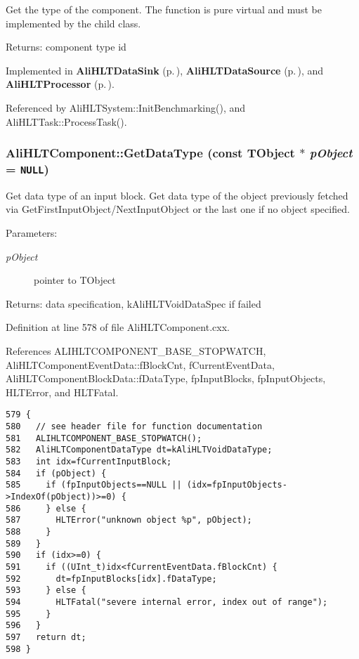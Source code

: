 Get the type of the component. The function is pure virtual and must be implemented by the child class. \begin{Desc}
\item[Returns:]component type id \end{Desc}


Implemented in {\bf Ali\-HLTData\-Sink} {\rm (p.\,\pageref{classAliHLTDataSink_a3})}, {\bf Ali\-HLTData\-Source} {\rm (p.\,\pageref{classAliHLTDataSource_a3})}, and {\bf Ali\-HLTProcessor} {\rm (p.\,\pageref{classAliHLTProcessor_a5})}.

Referenced by Ali\-HLTSystem::Init\-Benchmarking(), and Ali\-HLTTask::Process\-Task().
\subsubsection{ Ali\-HLTComponent::Get\-Data\-Type (const TObject $\ast$ {\em p\-Object} = {\tt NULL})\hspace{0.3cm}{\tt  [protected]}}\label{classAliHLTComponent_b16}


Get data type of an input block. Get data type of the object previously fetched via Get\-First\-Input\-Object/Next\-Input\-Object or the last one if no object specified. \begin{Desc}
\item[Parameters:]
\begin{description}
\item[{\em p\-Object}]pointer to TObject \end{description}
\end{Desc}
\begin{Desc}
\item[Returns:]data specification, k\-Ali\-HLTVoid\-Data\-Spec if failed \end{Desc}


Definition at line 578 of file Ali\-HLTComponent.cxx.

References ALIHLTCOMPONENT\_\-BASE\_\-STOPWATCH, Ali\-HLTComponent\-Event\-Data::f\-Block\-Cnt, f\-Current\-Event\-Data, Ali\-HLTComponent\-Block\-Data::f\-Data\-Type, fp\-Input\-Blocks, fp\-Input\-Objects, HLTError, and HLTFatal.

\footnotesize\begin{verbatim}579 {
580   // see header file for function documentation
581   ALIHLTCOMPONENT_BASE_STOPWATCH();
582   AliHLTComponentDataType dt=kAliHLTVoidDataType;
583   int idx=fCurrentInputBlock;
584   if (pObject) {
585     if (fpInputObjects==NULL || (idx=fpInputObjects->IndexOf(pObject))>=0) {
586     } else {
587       HLTError("unknown object %p", pObject);
588     }
589   }
590   if (idx>=0) {
591     if ((UInt_t)idx<fCurrentEventData.fBlockCnt) {
592       dt=fpInputBlocks[idx].fDataType;
593     } else {
594       HLTFatal("severe internal error, index out of range");
595     }
596   }
597   return dt;
598 }
\end{verbatim}\normalsize 


